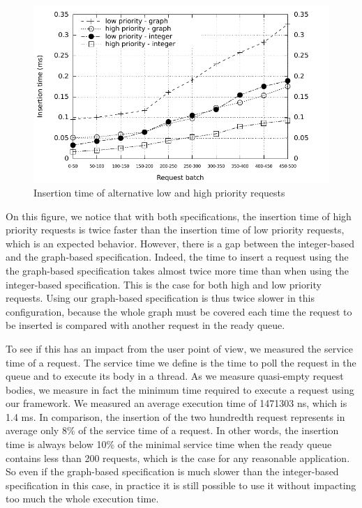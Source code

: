 \documentclass[11pt]{report}
\begin{document}
\begin{figure}[!ht]
      \begin{minipage}[c]{\textwidth}
      \centering
      \includegraphics[scale=1]{pictures/alternate.pdf}
      \end{minipage}
      \caption{Insertion time of alternative low and high priority requests}
      \label{fig:alternate} 
\end{figure}

On this figure, we notice that with both specifications, the insertion time of high priority requests is twice faster than the insertion time of low priority requests, which is an expected behavior. However, there is a gap between the integer-based and the graph-based specification. Indeed, the time to insert a request using the the graph-based specification takes almost twice more time than when using the integer-based specification. This is the case for both high and low priority requests. Using our graph-based specification is thus twice slower in this configuration, because the whole graph must be covered each time the request to be inserted is compared with another request in the ready queue. 

To see if this has an impact from the user point of view, we measured the service time of a request. The service time we define is the time to poll the request in the queue and to execute its body in a thread. As we measure quasi-empty request bodies, we measure in fact the minimum time required to execute a request using our framework.
We measured an average execution time of 1471303 ns, which is 1.4 ms. In comparison, the insertion of the two hundredth request represents in average only 8\% of the service time of a request. In other words, the insertion time is always below 10\% of the minimal service time when the ready queue contains less than 200 requests, which is the case for any reasonable application. So even if the graph-based specification is much slower than the integer-based specification in this case, in practice it is still possible to use it without impacting too much the whole execution time.
\end{document}
